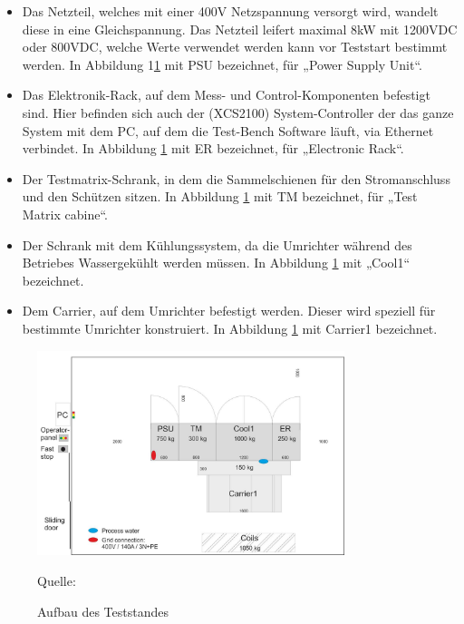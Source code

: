 \begin{itemize}
\item Das Netzteil, welches mit einer 400V Netzspannung versorgt wird, wandelt diese in eine Gleichspannung. Das Netzteil leifert maximal 8kW mit 1200VDC oder 800VDC, welche Werte verwendet werden kann vor Teststart bestimmt werden. In Abbildung 1\ref{fig:1. Aufbau des Teststandes} mit PSU bezeichnet, für „Power Supply Unit“.


\item Das Elektronik-Rack, auf dem Mess- und Control-Komponenten befestigt sind. Hier befinden sich auch der (XCS2100) System-Controller der das ganze System mit dem PC, auf dem die Test-Bench Software läuft, via Ethernet verbindet. In Abbildung \ref{fig:1. Aufbau des Teststandes} mit ER bezeichnet, für „Electronic Rack“.


\item Der Testmatrix-Schrank, in dem die Sammelschienen für den Stromanschluss und den Schützen sitzen. In Abbildung \ref{fig:1. Aufbau des Teststandes} mit TM bezeichnet, für „Test Matrix cabine“.


\item Der Schrank mit dem Kühlungssystem, da die Umrichter während des Betriebes Wassergekühlt werden müssen. In Abbildung \ref{fig:1. Aufbau des Teststandes} mit „Cool1“ bezeichnet.


\item Dem Carrier, auf dem Umrichter befestigt werden. Dieser wird speziell für bestimmte Umrichter konstruiert. In Abbildung \ref{fig:1. Aufbau des Teststandes} mit Carrier1 bezeichnet.

\end{itemize}


\begin{figure}[h]
    \centering
    \includegraphics[width=0.8\textwidth]{Grafiken/Test Cabin.jpg}
    \caption{Aufbau des Teststandes}
    \label{fig:1. Aufbau des Teststandes}
    {Quelle: \cite*[7]{Main_Manuel_USTB2018}}
\end{figure}


